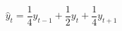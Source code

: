\begin{equation}
  \hat y_t = \frac{1}{4} y_{t-1} + \frac{1}{2} y_t + \frac{1}{4} y_{t + 1} 
  \label{eq:hanning}
\end{equation}






